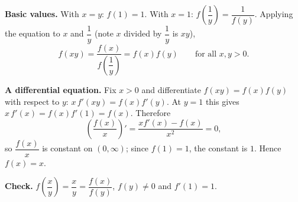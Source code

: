 \textbf{Basic values.} With $x=y$: $f(1)=1$. With $x=1$: $f\!\left(\dfrac{1}{y}\right)=\dfrac{1}{f(y)}$. Applying the equation to $x$ and $\dfrac{1}{y}$ (note $x$ divided by $\dfrac{1}{y}$ is $xy$),
\[
f(xy)=\dfrac{f(x)}{f\left(\dfrac{1}{y}\right)}=f(x)f(y)\qquad\text{for all }x,y>0 .
\]

\textbf{A differential equation.} Fix $x>0$ and differentiate $f(xy)=f(x)f(y)$ with respect to $y$: $x\,f'(xy)=f(x)f'(y)$. At $y=1$ this gives $x\,f'(x)=f(x)f'(1)=f(x)$. Therefore
\[
\left(\dfrac{f(x)}{x}\right)'=\dfrac{x f'(x)-f(x)}{x^2}=0,
\]
so $\dfrac{f(x)}{x}$ is constant on $(0,\infty)$; since $f(1)=1$, the constant is $1$. Hence $\boxed{f(x)=x}$.

\textbf{Check.} $f\!\left(\dfrac {x}{y}\right)=\dfrac {x}{y}=\dfrac{f(x)}{f(y)}$, $f(y)\ne0$ and $f'(1)=1$.
